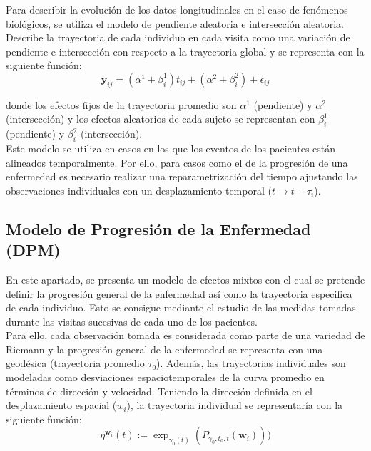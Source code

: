 	Para describir la evolución de los datos longitudinales en el caso de fenómenos biológicos, se utiliza el modelo de pendiente aleatoria e intersección aleatoria. Describe la trayectoria de cada individuo en cada visita como una variación de pendiente e intersección con respecto a la trayectoria global y se representa con la siguiente función:
	\begin{equation}
		\textbf{y}_{ij}=(\alpha^{1}+\beta_{i}^{1})t_{ij}+(\alpha^{2}+\beta_{i}^{2})+\epsilon_{ij}
	\end{equation}
	
	donde los efectos fijos de la trayectoria promedio son $\alpha^{1}$ (pendiente) y $\alpha^{2}$ (intersección) y los efectos aleatorios de cada sujeto se representan con $\beta_{i}^{1}$ (pendiente) y $\beta_{i}^{2}$ (intersección).\\
	
	Este modelo se utiliza en casos en los que los eventos de los pacientes están alineados temporalmente. Por ello, para casos como el de la progresión de una enfermedad es necesario realizar una reparametrización del tiempo ajustando las observaciones individuales con un desplazamiento temporal ($t \rightarrow t-\tau_{i}$).
	
	\subsection{Modelo de Progresión de la Enfermedad (DPM)}
	En este apartado, se presenta un modelo de efectos mixtos con el cual se pretende definir la progresión general de la enfermedad así como la trayectoria especifica de cada individuo. Esto se consigue mediante el estudio de las medidas tomadas durante las visitas sucesivas de cada uno de los pacientes.\\
	
	Para ello, cada observación tomada es considerada como parte de una variedad de Riemann y la progresión general de la enfermedad se representa con una geodésica (trayectoria promedio $\tau_{0}$). Además, las trayectorias individuales son modeladas como desviaciones espaciotemporales de la curva promedio en términos de dirección y velocidad. Teniendo la dirección definida en el desplazamiento espacial ($w_{i}$), la trayectoria individual se representaría con la siguiente función:
	\begin{equation}
		\eta^{\textbf{w}_{i}}(t):=\exp_{\gamma_0(t)} (P_{\gamma_0,t_0,t}(\textbf{w}_i)))
	\end{equation}
	
